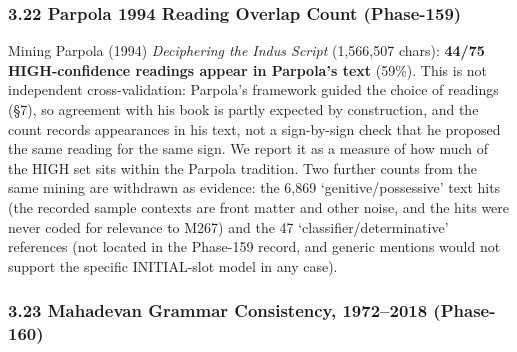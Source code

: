 \documentclass[
]{article}
\begin{document}
\subsubsection{3.22 Parpola 1994 Reading Overlap Count (Phase-159)}\label{parpola-1994-reading-cross-validation-phase-159}

Mining Parpola (1994) \emph{Deciphering the Indus Script} (1,566,507
chars): \textbf{44/75 HIGH-confidence readings appear in Parpola's text} (59\%). This is not independent cross-validation: Parpola's framework guided the choice of readings (§7), so agreement with his book is partly expected by construction, and the count records appearances in his text, not a sign-by-sign check that he proposed the same reading for the same sign. We report it as a measure of how much of the HIGH set sits within the Parpola tradition. Two further counts from the same mining are withdrawn as evidence: the 6,869 `genitive/possessive' text hits (the recorded sample contexts are front matter and other noise, and the hits were never coded for relevance to M267) and the 47 `classifier/determinative' references (not located in the Phase-159 record, and generic mentions would not support the specific INITIAL-slot model in any case).

\subsubsection{3.23 Mahadevan Grammar Consistency, 1972--2018
(Phase-160)}\label{mahadevan-four-decade-grammar-consistency-phase-160}
\end{document}
